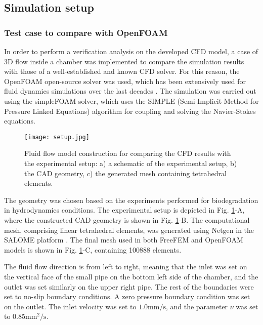 \subsection{Simulation setup}

\subsubsection{Test case to compare with OpenFOAM}


In order to perform a verification analysis on the developed {CFD} model, a case of 3D flow inside a chamber was implemented to compare the simulation results with those of a well-established and known {CFD} solver. For this reason, the OpenFOAM open-source solver was used, which has been extensively used for fluid dynamics simulations over the last decades \cite{Weller1998}. The simulation was carried out using the simpleFOAM solver, which uses the {SIMPLE} (Semi-Implicit Method for Pressure Linked Equations) algorithm for coupling and solving the Navier-Stokes equations.


\begin{figure}[h]
\centering
\medskip
\texttt{[image: setup.jpg]}
\caption[Fluid flow model construction for comparison with experimental setup]{Fluid flow model construction for comparing the {CFD} results with the experimental setup: a) a schematic of the experimental setup, b) the {CAD} geometry, c) the generated mesh containing tetrahedral elements.} \label{fig:fluid_setup}
\end{figure}

The geometry was chosen based on the experiments performed for biodegradation in hydrodynamics conditions. The experimental setup is depicted in Fig. \ref{fig:fluid_setup}-A, where the constructed {CAD} geometry is shown in Fig. \ref{fig:fluid_setup}-B. The computational mesh, comprising linear tetrahedral elements, was generated using Netgen \cite{Schoeberl1997} in the SALOME platform \cite{Ribes2007}. The final mesh used in both FreeFEM and OpenFOAM models is shown in Fig. \ref{fig:fluid_setup}-C, containing \num{100888} elements.

The fluid flow direction is from left to right, meaning that the inlet was set on the vertical face of the small pipe on the bottom left side of the chamber, and the outlet was set similarly on the upper right pipe. The rest of the boundaries were set to no-slip boundary conditions. A zero pressure boundary condition was set on the outlet. The inlet velocity was set to $1.0 \mathrm{mm}/\mathrm{s}$, and the parameter $\nu$ was set to $0.85 \mathrm{mm}^2/\mathrm{s}$.

